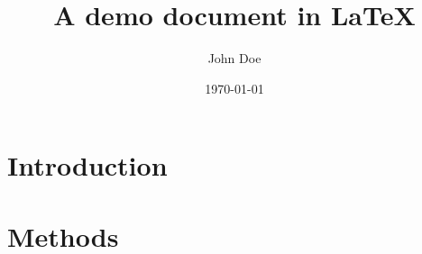 \documentclass{article}
\title{A demo document in \LaTeX{}}
\author{John Doe}
\date{\today}
\begin{document}
\maketitle

\lipsum[1]

\section*{Introduction}

\lipsum[1-5]

\section*{Methods}

\lipsum[1-5]
\end{document}
